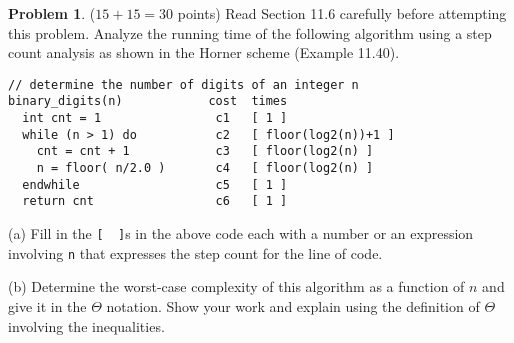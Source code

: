 \documentclass{article}
\theoremstyle{definition}
\newtheorem{problem}{Problem}
\begin{document}
\newpage
\begin{problem} ($15+15=30$ points) Read Section 11.6 carefully before attempting this problem.
Analyze the running time of the following algorithm using a step count analysis 
as shown in the Horner scheme (Example 11.40).
\begin{verbatim}
// determine the number of digits of an integer n
binary_digits(n)            cost  times
  int cnt = 1                c1   [ 1 ]
  while (n > 1) do           c2   [ floor(log2(n))+1 ]
    cnt = cnt + 1            c3   [ floor(log2(n) ]
    n = floor( n/2.0 )       c4   [ floor(log2(n) ]
  endwhile                   c5   [ 1 ]
  return cnt                 c6   [ 1 ]
\end{verbatim}
\noindent
(a) Fill in the \verb|[  ]|s in the above code each with a number or an expression involving
\verb|n| that expresses the step count for the line of code.

\medskip
\noindent
(b) Determine the worst-case complexity of this algorithm as a function of $n$
and give it in the $\Theta$ notation.
Show your work and explain using the definition of $\Theta$ involving the inequalities. 
\end{problem}
\end{document}
